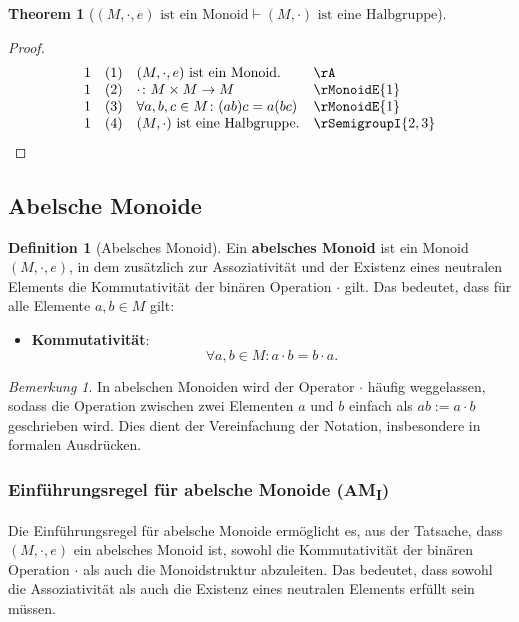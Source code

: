 \documentclass{book}
\theoremstyle{plain}
\newtheorem{theorem}{Theorem}
\theoremstyle{remark}
\newtheorem*{remark}{Bemerkung}
\theoremstyle{definition}
\newtheorem{definition}{Definition}[section]
\begin{document}
\label{LpMwMultweRpInMonoidImpLpMwMultRpInSemiGroup}
\begin{theorem}[\((M,\cdot, e) \text{ ist ein Monoid} \vdash (M,\cdot) \text{ ist eine Halbgruppe}\)]
\end{theorem}
\begin{proof}
	\[
	\begin{array}{llll}
		1 &  (1) & (M, \cdot, e) \text{ ist ein Monoid.} & \rA \\
		1 &  (2) & \cdot \colon M \times M \to M & \rMonoidE{1} \\			
		1 &  (3) & \forall a, b, c \in M \colon (ab)c = a(bc) & \rMonoidE{1} \\
		1 &  (4) & (M, \cdot) \text{ ist eine Halbgruppe.} & \rSemigroupI{2,3} \\	
	\end{array}
	\]
\end{proof}

\subsection{Abelsche Monoide}

\begin{definition}[Abelsches Monoid]
    Ein \textbf{abelsches Monoid} ist ein Monoid \((M, \cdot, e)\), in dem zusätzlich zur Assoziativität und der Existenz eines neutralen Elements die Kommutativität der binären Operation \(\cdot\) gilt. Das bedeutet, dass für alle Elemente \(a, b \in M\) gilt:
    
    \begin{itemize}
        \item \textbf{Kommutativität}:
        \[
        \forall a, b \in M \colon a \cdot b = b \cdot a.
        \]
    \end{itemize}
\end{definition}

\begin{remark}
    In abelschen Monoiden wird der Operator \(\cdot\) häufig weggelassen, sodass die Operation zwischen zwei Elementen \(a\) und \(b\) einfach als \(ab := a \cdot b\) geschrieben wird. Dies dient der Vereinfachung der Notation, insbesondere in formalen Ausdrücken.
\end{remark}

\subsubsection*{Einführungsregel für abelsche Monoide (AM\textsubscript{I})}
\label{rule:rAbelianMonoidE}
Die Einführungsregel für abelsche Monoide ermöglicht es, aus der Tatsache, dass \((M, \cdot, e)\) ein abelsches Monoid ist, sowohl die Kommutativität der binären Operation \(\cdot\) als auch die Monoidstruktur abzuleiten. Das bedeutet, dass sowohl die Assoziativität als auch die Existenz eines neutralen Elements erfüllt sein müssen.
\end{document}
